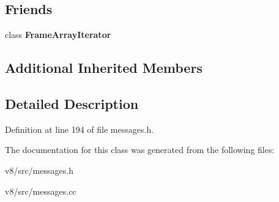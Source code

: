 \subsection*{Friends}
\begin{DoxyCompactItemize}
\item 
\mbox{\label{classv8_1_1internal_1_1AsmJsWasmStackFrame_af3c3172bd938659024c2add527940535}} 
class {\bfseries Frame\+Array\+Iterator}
\end{DoxyCompactItemize}
\subsection*{Additional Inherited Members}


\subsection{Detailed Description}


Definition at line 194 of file messages.\+h.



The documentation for this class was generated from the following files\+:\begin{DoxyCompactItemize}
\item 
v8/src/messages.\+h\item 
v8/src/messages.\+cc\end{DoxyCompactItemize}
